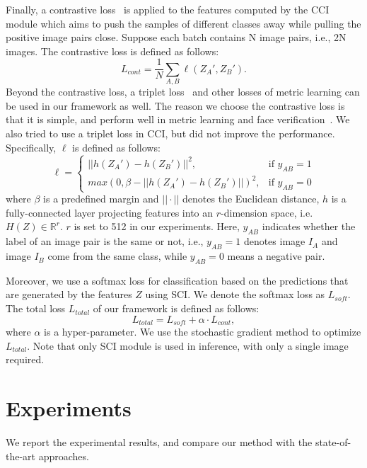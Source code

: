 \documentclass[letterpaper]{article} \usepackage{aaai20}  \usepackage{times}  \usepackage{helvet} \usepackage{courier}  \usepackage[hyphens]{url}  \usepackage{graphicx} \urlstyle{rm} \def\UrlFont{\rm}  \usepackage{graphicx}  \frenchspacing  \setlength{\pdfpagewidth}{8.5in}  \setlength{\pdfpageheight}{11in}  \usepackage{amsmath,amssymb}
\begin{document}
Finally, a contrastive loss~\cite{hadsell2006dimensionality} is applied to the features computed by the CCI module which aims to push the samples of different classes away while pulling the positive image pairs close.
Suppose each batch contains N image pairs, i.e., 2N images.
The contrastive loss is defined as follows:
\begin{equation}\label{eq:atten-input}
L_{cont} = \frac{1}{N}\sum_{A,B}\ell(Z_{A}', Z_{B}').
\end{equation}
Beyond the contrastive loss, a triplet loss~\cite{DBLP:conf/cvpr/SchroffKP15} and other losses of metric learning can be used in our framework as well. The reason we choose the contrastive loss is that it is simple, and perform well in metric learning and face verification~\cite{DBLP:conf/cvpr/TaigmanYRW14,hadsell2006dimensionality}. We also tried to use a triplet loss in CCI, but did not improve the performance. Specifically, $\ell$ is defined as follows:
\begin{equation}\label{eq:contras_loss}
\ell =
\begin{cases}
||h(Z_{A}')-h(Z_{B}')||^2,  & \mbox{if } y_{AB} = 1 \\
max(0, \beta - ||h(Z_{A}')-h(Z_{B}')||)^2, & \mbox{if } y_{AB} = 0
\end{cases}
\end{equation}
where
$\beta$ is a predefined margin and $||\cdot||$ denotes the Euclidean distance, $h$ is a fully-connected layer projecting features into an $r$-dimension space, i.e. $H(Z) \in \mathbb{R}^{r}$.
$r$ is set to 512 in our experiments.
Here, $y_{AB}$ indicates whether the label of an image pair is the same or not, i.e., $y_{AB}=1$ denotes image $I_A$ and image $I_B$ come from the same class, while $y_{AB}=0$ means a negative pair.

Moreover, we use a softmax loss for classification based on the predictions that are generated by the features $Z$ using SCI.
We denote the softmax loss as $L_{soft}$.
The total loss $L_{total}$ of our framework is defined as follows:
\begin{equation}\label{eq:loss}
L_{total} = L_{soft} + \alpha \cdot L_{cont},
\end{equation}
where $\alpha$ is a hyper-parameter.
We use the stochastic gradient method to optimize $L_{total}$.
Note that only SCI module is used in inference, with only a single image required.

\section{Experiments}
We report the experimental results, and compare our method with the state-of-the-art approaches.
\end{document}
